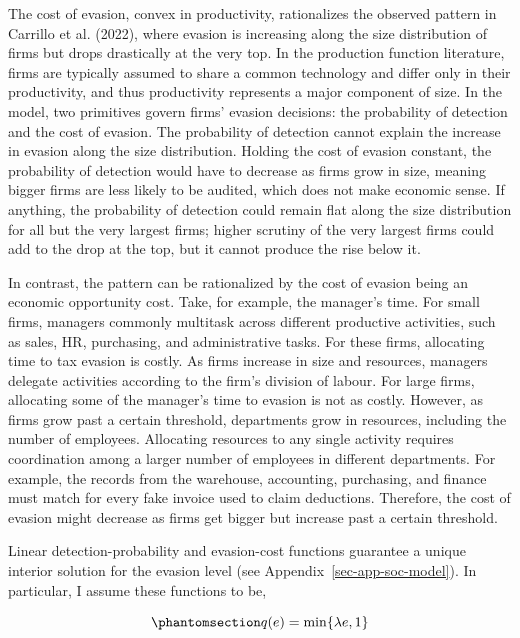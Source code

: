\documentclass[
  12pt,
  letterpaper,
  oneside,
  openany]{report}
\begin{document}
The cost of evasion, convex in productivity, rationalizes the observed
pattern in Carrillo et al. (2022), where evasion is increasing along the
size distribution of firms but drops drastically at the very top. In the
production function literature, firms are typically assumed to share a
common technology and differ only in their productivity, and thus
productivity represents a major component of size. In the model, two
primitives govern firms' evasion decisions: the probability of detection
and the cost of evasion. The probability of detection cannot explain the
increase in evasion along the size distribution. Holding the cost of
evasion constant, the probability of detection would have to decrease as
firms grow in size, meaning bigger firms are less likely to be audited,
which does not make economic sense. If anything, the probability of
detection could remain flat along the size distribution for all but the
very largest firms; higher scrutiny of the very largest firms could add
to the drop at the top, but it cannot produce the rise below it.

In contrast, the pattern can be rationalized by the cost of evasion
being an economic opportunity cost. Take, for example, the manager's
time. For small firms, managers commonly multitask across different
productive activities, such as sales, HR, purchasing, and administrative
tasks. For these firms, allocating time to tax evasion is costly. As
firms increase in size and resources, managers delegate activities
according to the firm's division of labour. For large firms, allocating
some of the manager's time to evasion is not as costly. However, as
firms grow past a certain threshold, departments grow in resources,
including the number of employees. Allocating resources to any single
activity requires coordination among a larger number of employees in
different departments. For example, the records from the warehouse,
accounting, purchasing, and finance must match for every fake invoice
used to claim deductions. Therefore, the cost of evasion might decrease
as firms get bigger but increase past a certain threshold.

Linear detection-probability and evasion-cost functions guarantee a
unique interior solution for the evasion level (see
Appendix~\ref{sec-app-soc-model}). In particular, I assume these
functions to be,

\begin{equation}\protect\phantomsection\label{eq-prob-detect}{
q(e)=\min\{\lambda e,1\}
}\end{equation}
\end{document}
